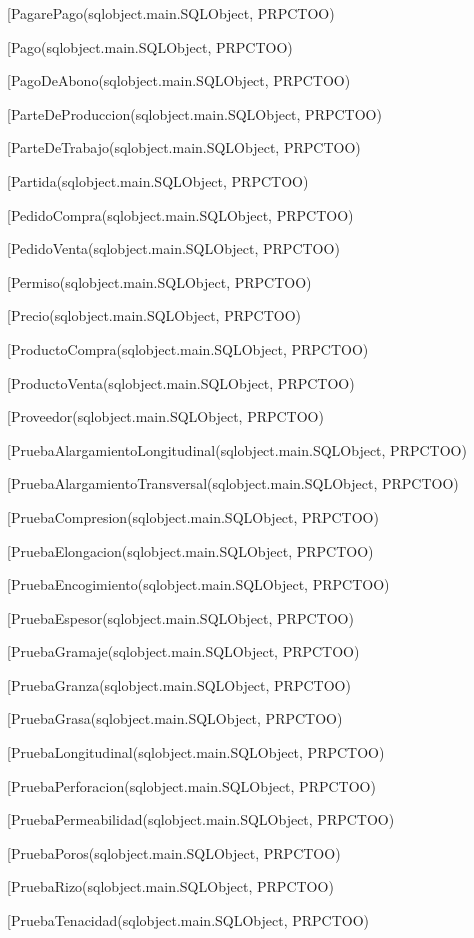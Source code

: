 \begin{description}
\begin{description}
\item[PagarePago(sqlobject.main.SQLObject, PRPCTOO)
\item[Pago(sqlobject.main.SQLObject, PRPCTOO)
\item[PagoDeAbono(sqlobject.main.SQLObject, PRPCTOO)
\item[ParteDeProduccion(sqlobject.main.SQLObject, PRPCTOO)
\item[ParteDeTrabajo(sqlobject.main.SQLObject, PRPCTOO)
\item[Partida(sqlobject.main.SQLObject, PRPCTOO)
\item[PedidoCompra(sqlobject.main.SQLObject, PRPCTOO)
\item[PedidoVenta(sqlobject.main.SQLObject, PRPCTOO)
\item[Permiso(sqlobject.main.SQLObject, PRPCTOO)
\item[Precio(sqlobject.main.SQLObject, PRPCTOO)
\item[ProductoCompra(sqlobject.main.SQLObject, PRPCTOO)
\item[ProductoVenta(sqlobject.main.SQLObject, PRPCTOO)
\item[Proveedor(sqlobject.main.SQLObject, PRPCTOO)
\item[PruebaAlargamientoLongitudinal(sqlobject.main.SQLObject, PRPCTOO)
\item[PruebaAlargamientoTransversal(sqlobject.main.SQLObject, PRPCTOO)
\item[PruebaCompresion(sqlobject.main.SQLObject, PRPCTOO)
\item[PruebaElongacion(sqlobject.main.SQLObject, PRPCTOO)
\item[PruebaEncogimiento(sqlobject.main.SQLObject, PRPCTOO)
\item[PruebaEspesor(sqlobject.main.SQLObject, PRPCTOO)
\item[PruebaGramaje(sqlobject.main.SQLObject, PRPCTOO)
\item[PruebaGranza(sqlobject.main.SQLObject, PRPCTOO)
\item[PruebaGrasa(sqlobject.main.SQLObject, PRPCTOO)
\item[PruebaLongitudinal(sqlobject.main.SQLObject, PRPCTOO)
\item[PruebaPerforacion(sqlobject.main.SQLObject, PRPCTOO)
\item[PruebaPermeabilidad(sqlobject.main.SQLObject, PRPCTOO)
\item[PruebaPoros(sqlobject.main.SQLObject, PRPCTOO)
\item[PruebaRizo(sqlobject.main.SQLObject, PRPCTOO)
\item[PruebaTenacidad(sqlobject.main.SQLObject, PRPCTOO)

\end{description}
\end{description}
